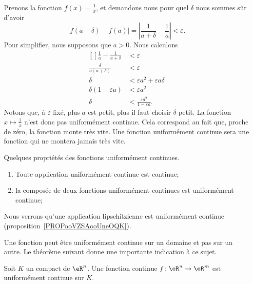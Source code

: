 \begin{example}
	Prenons la fonction \( f(x)=\frac{1}{ x }\), et demandons nous pour quel \( \delta\) nous sommes sûr d'avoir
	\begin{equation}
		| f(a+\delta)-f(a) |=\left| \frac{1}{ a+\delta }-\frac{1}{ a } \right| <\varepsilon.
	\end{equation}
	Pour simplifier, nous supposons que \( a>0\). Nous calculons
	\begin{equation}
		\begin{aligned}[]
			\frac{ 1 }{ a }-\frac{1}{ a+\delta } & <\varepsilon                                  \\
			\frac{ \delta }{ a(a+\delta) }       & <\varepsilon                                  \\
			\delta                               & <\varepsilon a^2+\varepsilon a\delta          \\
			\delta(1-\varepsilon a)              & <\varepsilon a^2                              \\
			\delta                               & <\frac{ \varepsilon a^2 }{ 1-\varepsilon a }.
		\end{aligned}
	\end{equation}
	Notons que, à \( \varepsilon\) fixé, plus \( a\) est petit, plus il faut choisir \( \delta\) petit. La fonction \( x\mapsto\frac{1}{ x }\) n'est donc pas uniformément continue. Cela correspond au fait que, proche de zéro, la fonction monte très vite. Une fonction uniformément continue sera une fonction qui ne montera jamais très vite.
\end{example}

\begin{proposition}     \label{PROPooVOUTooOtiGLG}
	Quelques propriétés des fonctions uniformément continues.
	\begin{enumerate}
		\item
		      Toute application uniformément continue est continue;
		\item
		      la composée de deux fonctions uniformément continues est uniformément continue;
	\end{enumerate}
\end{proposition}
Nous verrons qu'une application lipschitzienne est uniformément continue (proposition~\ref{PROPooVZSAooUneOQK}).

Une fonction peut être uniformément continue sur un domaine et pas sur un autre. Le théorème suivant donne une importante indication à ce sujet.
\begin{theorem}[Heine]		\label{ThoHeineContinueCompact}
	Soit \( K\) un compact de \( \eR^n\). Une fonction continue \( f\colon \eR^n\to \eR^m\) est uniformément continue sur \( K\).
\end{theorem}

